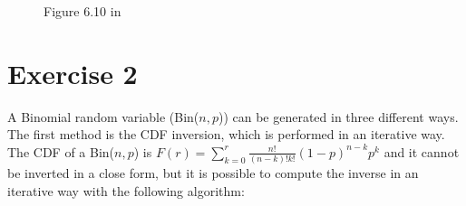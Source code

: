 \documentclass[10pt]{article}
\begin{document}
\begin{figure}
  \centering
  \caption{Figure 6.10 in \cite{leb}}
  \label{fig:610}
\end{figure}

\FloatBarrier

\clearpage

\section{Exercise 2}
A Binomial random variable (Bin($n, p$)) can be generated in three different ways. The first method is the CDF inversion, which is performed in an iterative way. The CDF of a Bin($n, p$) is $F(r) = \sum_{k = 0}^{r} \frac{n!}{(n-k)!k!} (1-p)^{n-k} p^k$ and it cannot be inverted in a close form, but it is possible to compute the inverse in an iterative way with the following algorithm:
\end{document}
